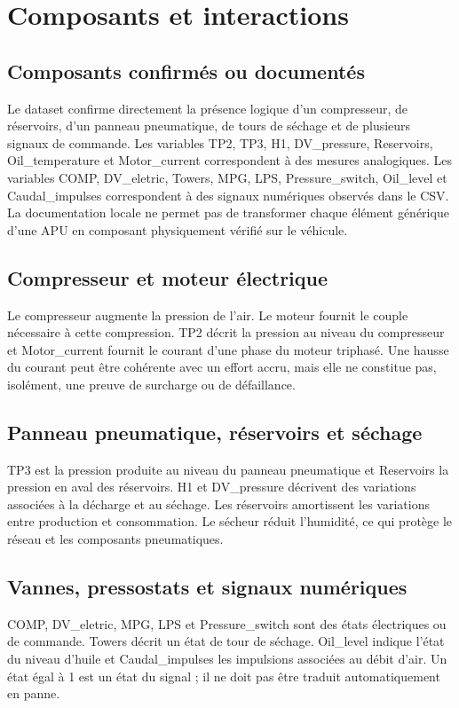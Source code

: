 \section{Composants et interactions}
\subsection{Composants confirmés ou documentés}
Le dataset confirme directement la présence logique d'un compresseur, de réservoirs, d'un panneau pneumatique, de tours de séchage et de plusieurs signaux de commande. Les variables TP2, TP3, H1, DV\_pressure, Reservoirs, Oil\_temperature et Motor\_current correspondent à des mesures analogiques. Les variables COMP, DV\_eletric, Towers, MPG, LPS, Pressure\_switch, Oil\_level et Caudal\_impulses correspondent à des signaux numériques observés dans le CSV. La documentation locale ne permet pas de transformer chaque élément générique d'une APU en composant physiquement vérifié sur le véhicule.

\subsection{Compresseur et moteur électrique}
Le compresseur augmente la pression de l'air. Le moteur fournit le couple nécessaire à cette compression. TP2 décrit la pression au niveau du compresseur et Motor\_current fournit le courant d'une phase du moteur triphasé. Une hausse du courant peut être cohérente avec un effort accru, mais elle ne constitue pas, isolément, une preuve de surcharge ou de défaillance.

\subsection{Panneau pneumatique, réservoirs et séchage}
TP3 est la pression produite au niveau du panneau pneumatique et Reservoirs la pression en aval des réservoirs. H1 et DV\_pressure décrivent des variations associées à la décharge et au séchage. Les réservoirs amortissent les variations entre production et consommation. Le sécheur réduit l'humidité, ce qui protège le réseau et les composants pneumatiques.

\subsection{Vannes, pressostats et signaux numériques}
COMP, DV\_eletric, MPG, LPS et Pressure\_switch sont des états électriques ou de commande. Towers décrit un état de tour de séchage. Oil\_level indique l'état du niveau d'huile et Caudal\_impulses les impulsions associées au débit d'air. Un état égal à 1 est un état du signal ; il ne doit pas être traduit automatiquement en panne.

